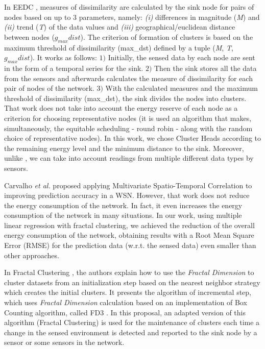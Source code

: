 \documentclass{acm_proc_article-sp}
\begin{document}
In EEDC \cite{Liu2007}, measures of dissimilarity are calculated by the sink
node for pairs of nodes based on up to $3$ parameters, namely: {\it (i)}
differences in magnitude (\textit{M}) and {\it (ii)} trend (\textit{T}) of the
data values and {\it (iii)} geographical/euclidean distance between nodes
($g_{max}dist$).
The criterion of formation of clusters is based on the maximum threshold of
dissimilarity (max\_dst) defined by a tuple (\textit{M}, \textit{T},
$g_{max}dist$). It works as follows: $1)$ Initially, the sensed data by each
node are sent in the form of a temporal series for the sink. $2)$ Then the sink
stores all the data from the sensors and afterwards calculates the measure of
dissimilarity for each pair of nodes of the network. $3)$
With the calculated measures and the maximum threshold of dissimilarity
(max\_dst), the sink divides the nodes into clusters.
That work does not take into account the energy reserve of each node as a
criterion for choosing representative nodes (it is used an algorithm that makes,
simultaneously, the equitable scheduling - round robin - along with the random
choice of representative nodes). In this work, we chose Cluster Heads according
to the remaining energy level and the minimum distance to the sink. Moreover,
unlike \cite{Liu2007}, we can take into account readings from multiple different
data types by sensors.
\vspace*{-.3cm}

Carvalho \textit{et al.} \cite{Carvalho2011} proposed applying Multivariate
Spatio-Temporal Correlation to improving prediction accuracy in a WSN. However,
that work does not reduce the energy consumption of the network. In fact, it
even increases the energy consumption of the network in many situations. In our
work, using multiple linear regression with fractal clustering, we achieved the
reduction of the overall energy consumption of the network, obtaining results
with a Root Mean Square Error (RMSE) for the prediction data (w.r.t. the sensed
data) even smaller than other approaches.
\vspace*{-.3cm}

In Fractal Clustering \cite{Barbara2000}, the authors explain how to use the
\textit{Fractal Dimension} to cluster datasets from an initialization step
based on the nearest neighbor strategy which creates the initial clusters. It
presents the algorithm of incremental step, which uses \textit{Fractal
Dimension} calculation based on an implementation of Box Counting algorithm,
called FD3 \cite{Liebovitch1989}. In this proposal, an adapted version of
this algorithm (Fractal Clustering) is used for the maintenance of clusters each
time a change in the sensed environment is detected and reported to the sink node by
a sensor or some sensors in the network.
\end{document}
